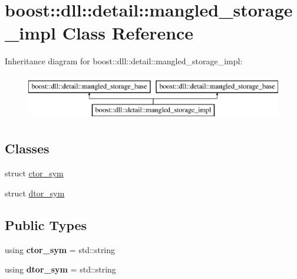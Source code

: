 \hypertarget{a01364}{}\section{boost\+:\+:dll\+:\+:detail\+:\+:mangled\+\_\+storage\+\_\+impl Class Reference}
\label{a01364}
Inheritance diagram for boost\+:\+:dll\+:\+:detail\+:\+:mangled\+\_\+storage\+\_\+impl\+:\begin{figure}[H]
\begin{center}
\leavevmode
\includegraphics[height=2.000000cm]{a01364}
\end{center}
\end{figure}
\subsection*{Classes}
\begin{DoxyCompactItemize}
\item 
struct \hyperlink{a01372}{ctor\+\_\+sym}
\item 
struct \hyperlink{a01376}{dtor\+\_\+sym}
\end{DoxyCompactItemize}
\subsection*{Public Types}
\begin{DoxyCompactItemize}
\item 
\mbox{\label{a01364_af94d7d89e97bb07a0500b440c4e7e0f7}} 
using {\bfseries ctor\+\_\+sym} = std\+::string
\item 
\mbox{\label{a01364_a3fbabc9589b8e863a2af59a0115ed748}} 
using {\bfseries dtor\+\_\+sym} = std\+::string
\end{DoxyCompactItemize}
